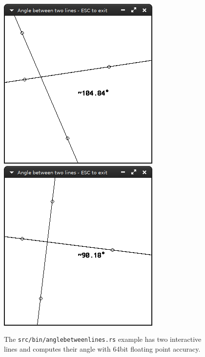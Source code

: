 \documentclass[12pt,openany,a4,usenames,dvipsnames]{book}
\DeclareRobustCommand{\Caption}[1]{\par%
  \vspace{1em}
  {\noindent{}#1}}
\begin{document}
\begin{figure}[H]
  \centering
  \begin{minipage}{0.49\textwidth}
    \includegraphics[width=\textwidth,keepaspectratio]{figures/anglelines1.png}
  \end{minipage}
  \hspace{.1em}
  \begin{minipage}{0.49\textwidth}
    \includegraphics[width=\textwidth,keepaspectratio]{figures/anglelines2.png}
  \end{minipage}
  \Caption{The \texttt{src/bin/anglebetweenlines.rs} example has two interactive lines and computes their angle with 64bit floating point accuracy.}
\end{figure}
%
%
%
%
\end{document}
